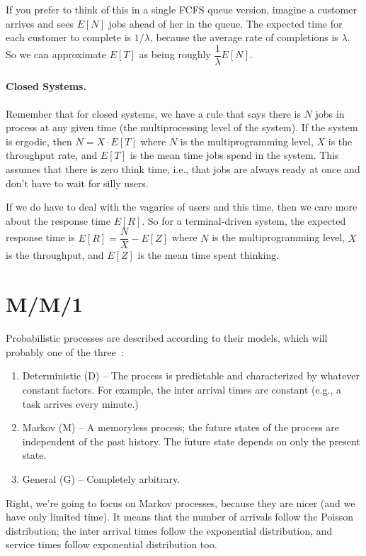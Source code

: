 If you prefer to think of this in a single FCFS queue version, imagine a customer arrives and sees $E[N]$ jobs ahead of her in the queue. The expected time for each customer to complete is $1/\lambda$, because the average rate of completions is $\lambda $. So we can approximate $E[T]$ as being roughly $\dfrac{1}{\lambda}E[N]$.

\paragraph{Closed Systems.} Remember that for closed systems, we have a rule that says there is $N$ jobs in process at any given time (the multiprocessing level of the system). If the system is ergodic, then $N = X \cdot E[T]$ where $N$ is the multiprogramming level, $X$ is the throughput rate, and $E[T]$ is the mean time jobs spend in the system. This assumes that there is zero think time, i.e., that jobs are always ready at once and don't have to wait for silly users.

If we do have to deal with the vagaries of users and this time, then we care more about the response time $E[R]$. So for a terminal-driven system, the expected response time is $E[R] = \dfrac{N}{X} - E[Z]$ where $N$ is the multiprogramming level, $X$ is the throughput, and $E[Z]$ is the mean time spent thinking. 

\section*{M/M/1}

Probabilistic processes are described according to their models, which will probably one of the three~\cite{swps}:

\begin{enumerate}
	\item Deterministic (D) -- The process is predictable and characterized by whatever constant factors. For example, the inter arrival times are constant (e.g., a task arrives every minute.)
	\item Markov (M) -- A memoryless process; the future states of the process are independent of the past history. The future state depends on only the present state.
	\item General (G) -- Completely arbitrary.
\end{enumerate}

Right, we're going to focus on Markov processes, because they are nicer (and we have only limited time). It means that the number of arrivals follow the Poisson distribution; the inter arrival times follow the exponential distribution, and service times follow exponential distribution too. 

